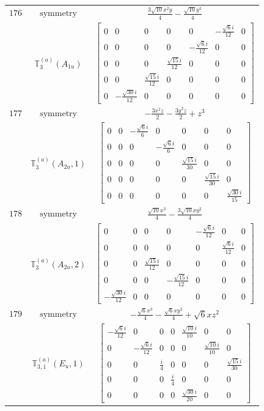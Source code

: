 \documentclass[fleqn,8pt,landscape]{jsarticle}
\begin{document}
\begin{longtable}{ccc}
$ 176 $ & $ \text{symmetry} $ & $ \frac{3 \sqrt{10} x^{2} y}{4} - \frac{\sqrt{10} y^{3}}{4} $ \\
$  $ & $ \mathbb{T}_{3}^{(a)}(A_{1u}) $ & $ \begin{bmatrix} 0 & 0 & 0 & 0 & 0 & - \frac{\sqrt{6} i}{12} & 0 \\ 0 & 0 & 0 & 0 & - \frac{\sqrt{6} i}{12} & 0 & 0 \\ 0 & 0 & 0 & \frac{\sqrt{15} i}{12} & 0 & 0 & 0 \\ 0 & 0 & \frac{\sqrt{15} i}{12} & 0 & 0 & 0 & 0 \\ 0 & - \frac{\sqrt{30} i}{12} & 0 & 0 & 0 & 0 & 0 \end{bmatrix} $ \\ \hline
$ 177 $ & $ \text{symmetry} $ & $ - \frac{3 x^{2} z}{2} - \frac{3 y^{2} z}{2} + z^{3} $ \\
$  $ & $ \mathbb{T}_{3}^{(a)}(A_{2u},1) $ & $ \begin{bmatrix} 0 & 0 & - \frac{\sqrt{6} i}{6} & 0 & 0 & 0 & 0 \\ 0 & 0 & 0 & - \frac{\sqrt{6} i}{6} & 0 & 0 & 0 \\ 0 & 0 & 0 & 0 & \frac{\sqrt{15} i}{30} & 0 & 0 \\ 0 & 0 & 0 & 0 & 0 & \frac{\sqrt{15} i}{30} & 0 \\ 0 & 0 & 0 & 0 & 0 & 0 & \frac{\sqrt{30} i}{15} \end{bmatrix} $ \\ \hline
$ 178 $ & $ \text{symmetry} $ & $ \frac{\sqrt{10} x^{3}}{4} - \frac{3 \sqrt{10} x y^{2}}{4} $ \\
$  $ & $ \mathbb{T}_{3}^{(a)}(A_{2u},2) $ & $ \begin{bmatrix} 0 & 0 & 0 & 0 & - \frac{\sqrt{6} i}{12} & 0 & 0 \\ 0 & 0 & 0 & 0 & 0 & \frac{\sqrt{6} i}{12} & 0 \\ 0 & 0 & \frac{\sqrt{15} i}{12} & 0 & 0 & 0 & 0 \\ 0 & 0 & 0 & - \frac{\sqrt{15} i}{12} & 0 & 0 & 0 \\ - \frac{\sqrt{30} i}{12} & 0 & 0 & 0 & 0 & 0 & 0 \end{bmatrix} $ \\ \hline
$ 179 $ & $ \text{symmetry} $ & $ - \frac{\sqrt{6} x^{3}}{4} - \frac{\sqrt{6} x y^{2}}{4} + \sqrt{6} x z^{2} $ \\
$  $ & $ \mathbb{T}_{3,1}^{(a)}(E_{u},1) $ & $ \begin{bmatrix} - \frac{\sqrt{6} i}{12} & 0 & 0 & 0 & \frac{\sqrt{10} i}{10} & 0 & 0 \\ 0 & - \frac{\sqrt{6} i}{12} & 0 & 0 & 0 & \frac{\sqrt{10} i}{10} & 0 \\ 0 & 0 & \frac{i}{4} & 0 & 0 & 0 & \frac{\sqrt{15} i}{30} \\ 0 & 0 & 0 & \frac{i}{4} & 0 & 0 & 0 \\ 0 & 0 & 0 & 0 & \frac{\sqrt{30} i}{20} & 0 & 0 \end{bmatrix} $ \\ \hline

\end{longtable}
\end{document}
